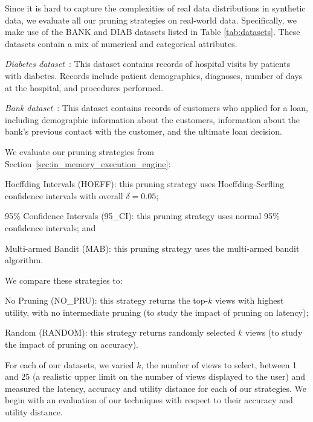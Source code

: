  Since it is hard to capture the complexities of real data distributions in synthetic data, we
evaluate all our pruning strategies on real-world data. 
Specifically, we make use of the BANK and DIAB datasets listed in Table
\ref{tab:datasets}. These datasets
contain a mix of numerical and categorical attributes.
\begin{compactitem}
\item {\it Diabetes dataset}~\cite{XXX}: This dataset contains records of hospital
visits by patients with diabetes. Records include patient demographics,
diagnoses, number of days at the hospital, and procedures performed. 
\item {\it Bank dataset}~\cite{XXX}: This dataset contains records of customers who
applied for a loan, including demographic information about the
customers, information about the bank's previous contact with the customer, and
the ultimate loan decision.
\end{compactitem}
 We evaluate our pruning strategies from Section~\ref{sec:in_memory_execution_engine}:
\begin{compactenum}[(a)]
 \item Hoeffding Intervals (HOEFF): this pruning strategy uses Hoeffding-Serfling
 confidence intervals with overall $\delta = 0.05$; 
 \item 95\% Confidence Intervals (95\_CI): this pruning strategy uses normal 95\% confidence intervals; and 
\item Multi-armed Bandit (MAB): this pruning strategy uses the multi-armed bandit algorithm.
\end{compactenum}
We compare these strategies to:
\begin{compactenum}[(a)]
\item No Pruning (NO\_PRU): this strategy returns the top-$k$ views with highest utility,
with no intermediate pruning (to study the impact of pruning on latency);
\item Random (RANDOM): this strategy returns randomly selected $k$ views (to study the impact of pruning on accuracy).
\end{compactenum}

For each of our datasets, we varied $k$, the number of views to select, between
1 and 25 (a realistic upper limit on the number of views displayed to the user)
and measured the latency, accuracy and utility distance for each of our
strategies. We begin with an evaluation of our techniques with respect to their accuracy
and utility distance.


